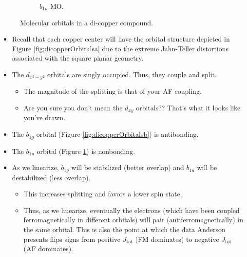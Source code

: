 \documentclass[../notes.tex]{subfiles}
\begin{document}
\begin{itemize}
\begin{figure}[H]
\begin{subfigure}[b]{0.3\linewidth}
            \caption{$b_{1u}$ MO.}
            \label{fig:dicopperOrbitalsc}
        \end{subfigure}
        \caption{Molecular orbitals in a di-copper compound.}
        \label{fig:dicopperOrbitals}
    \end{figure}
    \begin{itemize}
        \item Recall that each copper center will have the orbital structure depicted in Figure \ref{fig:dicopperOrbitalsa} due to the extreme Jahn-Teller distortions associated with the square planar geometry.
        \item The $d_{x^2-y^2}$ orbitals are singly occupied. Thus, they couple and split.
        \begin{itemize}
            \item The magnitude of the splitting is that of your AF coupling.
            \item Are you sure you don't mean the $d_{xy}$ orbitals?? That's what it looks like you've drawn.
        \end{itemize}
        \item The $b_{1g}$ orbital (Figure \ref{fig:dicopperOrbitalsb}) is antibonding.
        \item The $b_{1u}$ orbital (Figure \ref{fig:dicopperOrbitalsc}) is nonbonding.
        \item As we linearize, $b_{1g}$ will be stabilized (better overlap) and $b_{1u}$ will be destabilized (less overlap).
        \begin{itemize}
            \item This increases splitting and favors a lower spin state.
            \item Thus, as we linearize, eventually the electrons (which have been coupled ferromagnetically in different orbitals) will pair (antiferromagnetically) in the same orbital. This is also the point at which the data Anderson presents flips signs from positive $J_\text{tot}$ (FM dominates) to negative $J_\text{tot}$ (AF dominates).

\end{itemize}
\end{itemize}
\end{itemize}
\end{document}
